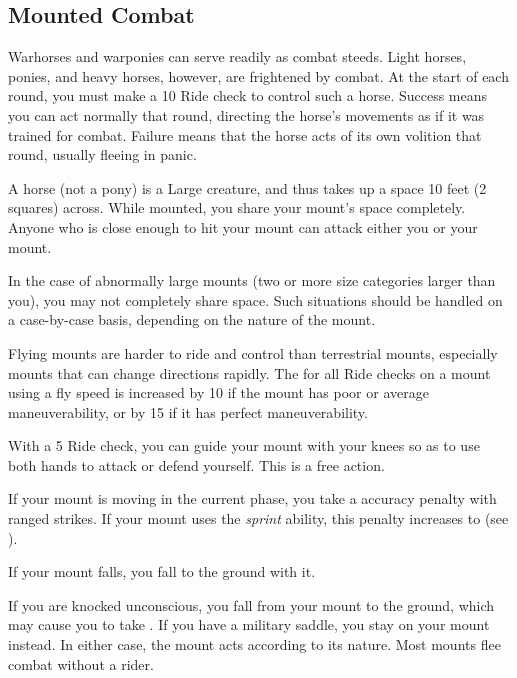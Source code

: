     \subsection{Mounted Combat}\label{Mounted Combat}
         Warhorses and warponies can serve readily as combat steeds. Light horses, ponies, and heavy horses, however, are frightened by combat.
        At the start of each round, you must make a  10 Ride check to control such a horse.
        Success means you can act normally that round, directing the horse's movements as if it was trained for combat.
        Failure means that the horse acts of its own volition that round, usually fleeing in panic.

         A horse (not a pony) is a Large creature, and thus takes up a space 10 feet (2 squares) across. While mounted, you share your mount's space completely. Anyone who is close enough to hit your mount can attack either you or your mount.

        In the case of abnormally large mounts (two or more size categories larger than you), you may not completely share space. Such situations should be handled on a case-by-case basis, depending on the nature of the mount.

         Flying mounts are harder to ride and control than terrestrial mounts, especially mounts that can change directions rapidly.
        The  for all Ride checks on a mount using a fly speed is increased by 10 if the mount has poor or average maneuverability, or by 15 if it has perfect maneuverability.

         With a  5 Ride check, you can guide your mount with your knees so as to use both hands to attack or defend yourself. This is a free action.

        If your mount is moving in the current phase, you take a  accuracy penalty with ranged strikes.
        If your mount uses the \textit{sprint} ability, this penalty increases to  (see ).

         If your mount falls, you fall to the ground with it.

         If you are knocked unconscious, you fall from your mount to the ground, which may cause you to take .
        If you have a military saddle, you stay on your mount instead.
        In either case, the mount acts according to its nature.
        Most mounts flee combat without a rider.

